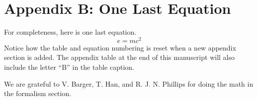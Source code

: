 \section{Appendix B: One Last Equation}
For completeness, here is one last equation.
\setcounter{equation}{0}  \begin{equation}
e = mc^2  
\end{equation}
Notice how the table and equation numbering is reset when a new appendix
section is added.  The appendix table at the end of this manuscript will
also include the letter ``B'' in the table caption.


\acknowledgments
We are grateful to V. Barger, T. Han, and R. J. N. Phillips for
doing the math in the formalism section.

\newpage



